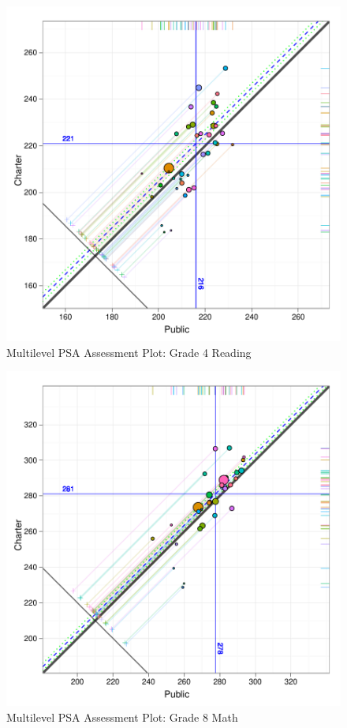 \documentclass[man,floatsintext]{apa6}
\begin{document}
\begin{figure}[t]
\begin{center}
\includegraphics[width=\textwidth]{../Figures/g4readingtreecircplot.pdf}
\caption{Multilevel PSA Assessment Plot: Grade 4 Reading}
\label{g4readtreecircplot.pdf}
\end{center}
\end{figure}

\begin{figure}[t]
\begin{center}
\includegraphics[width=\textwidth]{../Figures/g8mathtreecircplot.pdf}
\caption{Multilevel PSA Assessment Plot: Grade 8 Math}
\label{g8mathtreecircplot.pdf}
\end{center}
\end{figure}
\end{document}
